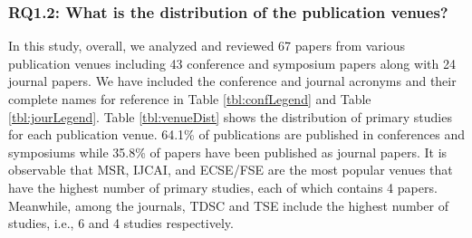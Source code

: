 







\subsubsection{RQ1.2: What is the distribution of the publication venues?}
In this study, overall, we analyzed and reviewed 67 papers from various publication venues including 43 conference and symposium papers along with 24 journal papers. We have included the conference and journal acronyms and their complete names for reference in Table \ref{tbl:confLegend} and Table \ref{tbl:jourLegend}. Table \ref{tbl:venueDist}
shows the distribution of primary studies for each publication venue. 64.1\% of publications are published in conferences and symposiums while 35.8\% of papers have been published as journal papers. It is observable that MSR, IJCAI, and ECSE/FSE are the most popular venues that have the highest number of primary studies, each of which contains 4 papers. %
Meanwhile, among the journals, TDSC and TSE include the highest number of studies, i.e., 6 and 4 studies respectively.








